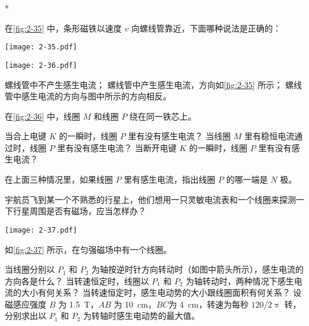 \begin{Exercise}*
\begin{question}
  \item 在\cref{fig:2-35} 中，条形磁铁以速度 $v$ 向螺线管靠近，下面哪种说法是正确的：
  \begin{figurehere}
    \begin{minipage}[b]{0.38\linewidth}\centering
      \texttt{[image: 2-35.pdf]}
      \caption{}\label{fig:2-35}
    \end{minipage}
    \begin{minipage}[b]{0.58\linewidth}\centering
      \texttt{[image: 2-36.pdf]}
      \caption{}\label{fig:2-36}
    \end{minipage}
  \end{figurehere}
  \begin{tasks}
    \task 螺线管中不产生感生电流；
    \task 螺线管中产生感生电流，方向如\cref{fig:2-35} 所示；
    \task 螺线管中感生电流的方向与图中所示的方向相反。
  \end{tasks}
  \item 在\cref{fig:2-36} 中，线圈 $M$ 和线圈 $P$ 绕在同一铁芯上。
  \begin{tasks}
    \task 当合上电键 $K$ 的一瞬时，线圈 $P$ 里有没有感生电流？
    \task 当线圈 $M$ 里有稳恒电流通过时，线圈 $P$ 里有没有感生电流？
    \task 当断开电键 $K$ 的一瞬时，线圈 $P$ 里有没有感生电流？
  \end{tasks}
  在上面三种情况里，如果线圈 $P$ 里有感生电流，指出线圈 $P$ 的哪一端是 $N$ 极。
  \item 宇航员飞到某一个不熟悉的行星上，他们想用一只灵敏电流表和一个线圈来探测一下行星周围是否有磁场，应当怎样办？
  \begin{figurehere}
    \begin{minipage}{\linewidth}\centering
      \texttt{[image: 2-37.pdf]}
      \caption{}\label{fig:2-37}
    \end{minipage}
  \end{figurehere}
  \item 如\cref{fig:2-37} 所示，在匀强磁场中有一个线圈。
  \begin{tasks}
    \task 当线圈分别以 $P_1$ 和 $P_2$ 为轴按逆时针方向转动时（如图中箭头所示），感生电流的方向各是什么？
    \task 当转速恒定时，线圈以 $P_1$ 和 $P_2$ 为轴转动时，两种情况下感生电流的大小有何关系？
    \task 当转速恒定时，感生电动势的大小跟线圈面积有何关系？
    \task 设磁感应强度 $B$ 为 \qty{1.5}{T}，$AB$ 为 \qty{10}{cm}，$BC$为 \qty{4}{cm}，转速为每秒 $120/2\uppi$ 转，分别求出以 $P_1$ 和 $P_2$ 为转轴时感生电动势的最大值。

\end{tasks}
\end{question}
\end{Exercise}
